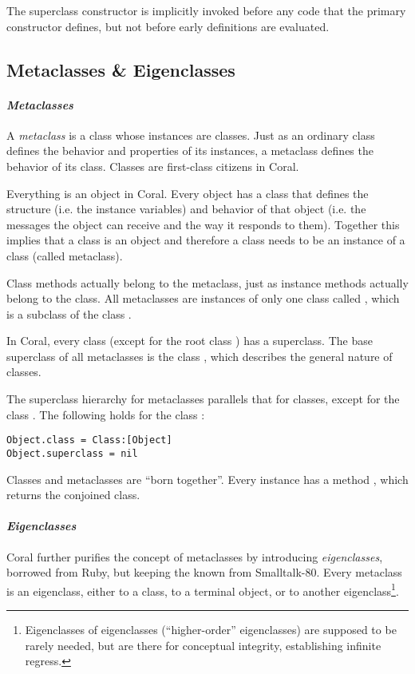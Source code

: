 The superclass constructor is implicitly invoked before any code that the primary constructor defines, but not before early definitions are evaluated. 





\subsection{Metaclasses \& Eigenclasses}
\label{sec:metaclasses}
\label{sec:eigenclasses}

\paragraph{\em Metaclasses}
A {\em metaclass} is a class whose instances are classes. Just as an ordinary class defines the behavior and properties of its instances, a metaclass defines the behavior of its class. Classes are first-class citizens in Coral. 

Everything is an object in Coral. Every object has a class that defines the structure (i.e. the instance variables) and behavior of that object (i.e. the messages the object can receive and the way it responds to them). Together this implies that a class is an object and therefore a class needs to be an instance of a class (called metaclass). 

Class methods actually belong to the metaclass, just as instance methods actually belong to the class. All metaclasses are instances of only one class called , which is a subclass of the class . 

In Coral, every class (except for the root class ) has a superclass. The base superclass of all metaclasses is the class , which describes the general nature of classes. 

The superclass hierarchy for metaclasses parallels that for classes, except for the class . The following holds for the class :
\begin{lstlisting}[deletekeywords={class}]
Object.class = Class:[Object]
Object.superclass = nil
\end{lstlisting}

Classes and metaclasses are ``born together''. Every  instance has a method , which returns the conjoined class. 

\paragraph{\em Eigenclasses}
Coral further purifies the concept of metaclasses by introducing {\em eigenclasses}, borrowed from Ruby, but keeping the  known from Smalltalk-80. Every metaclass is an eigenclass, either to a class, to a terminal object, or to another eigenclass\footnote{Eigenclasses of eigenclasses (``higher-order'' eigenclasses) are supposed to be rarely needed, but are there for conceptual integrity, establishing infinite regress.}. 

